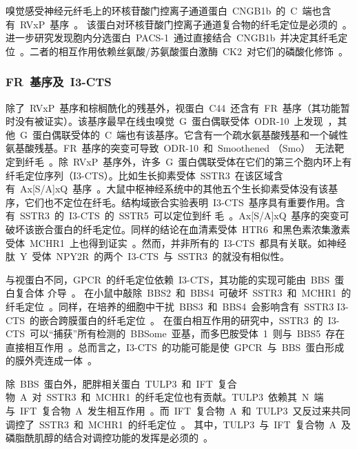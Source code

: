 嗅觉感受神经元纤毛上的环核苷酸门控离子通道蛋白\ CNGB1b\ 的\ C\ 端也含有\ RVxP\ 基序\ \citep{Jenkins2006}。 该蛋白对环核苷酸门控离子通道复合物的纤毛定位是必须的\ \citep{Jenkins2009,Michalakis2006}。 进一步研究发现胞内分选蛋白\ PACS-1\
通过直接结合\ CNGB1b\ 并决定其纤毛定位\ \citep{Jenkins2009}。二者的相互作用依赖丝氨酸/苏氨酸蛋白激酶\ CK2\ 对它们的磷酸化修饰\ \citep{Jenkins2009}。

\subsubsection{FR\ 基序及\ I3-CTS}
除了\ RVxP\ 基序和棕榈酰化的残基外，视蛋白\ C44\ 还含有\ FR\ 基序（其功能暂时没有被证实）。该基序最早在线虫嗅觉\ G\ 蛋白偶联受体\ ODR-10\ 上发现\ \citep{Dwyer2001}，其他\ G\ 蛋白偶联受体的\ C\ 端也有该基序。它含有一个疏水氨基酸残基和一个碱性氨基酸残基。FR\ 基序的突变可导致\ ODR-10\ 和\ Smoothened （Smo）\ 无法靶定到纤毛\ \citep{Dwyer2001}。除\ RVxP\ 基序外，许多\ G\ 蛋白偶联受体在它们的第三个胞内环上有纤毛定位序列（I3-CTS）\citep{Berbari2008}。比如生长抑素受体\ SSTR3\ 在该区域含有\ Ax[S/A]xQ\ 基序\ \citep{Berbari2008}。大鼠中枢神经系统中的其他五个生长抑素受体没有该基序，它们也不定位在纤毛。结构域嵌合实验表明\ I3-CTS\ 基序具有重要作用。含有\ SSTR3\ 的\ I3-CTS\ 的\ SSTR5\ 可以定位到纤
毛\ \citep{Berbari2008}。Ax[S/A]xQ\ 基序的突变可破坏该嵌合蛋白的纤毛定位。同样的结论在血清素受体\ HTR6\ 和黑色素浓集激素受体\ MCHR1\
上也得到证实\ \citep{Berbari2008}。然而，并非所有的\ I3-CTS\ 都具有关联。如神经肽\ Y\ 受体\ NPY2R\ 的两个\ I3-CTS\ 与\ SSTR3\ 的就没有相似性。

与视蛋白不同，GPCR\ 的纤毛定位依赖\ I3-CTS，其功能的实现可能由\ BBS\ 蛋白复合体
介导\ \citep{Berbari2008a}。 在小鼠中敲除\ BBS2\ 和\ BBS4\ 可破坏\ SSTR3\ 和\ MCHR1\ 的纤毛定位\ \citep{Berbari2008a}。同样，在培养的细胞中干扰\ BBS3\ 和\ BBS4\ 会影响含有\ SSTR3 I3-CTS\ 的嵌合跨膜蛋白的纤毛定位\ \citep{Berbari2008a}。 在蛋白相互作用的研究中，SSTR3\ 的\ I3-CTS\ 可以“捕获”所有检测的\ BBSome\ 亚基，而多巴胺受体\ 1\ 则与\ BBS5\ 存在直接相互作用\ \citep{Berbari2008a}。总而言之，I3-CTS\ 的功能可能是使\ GPCR\ 与\ BBS\ 蛋白形成的膜外壳连成一体\ \citep{Berbari2008a}。

除\ BBS\ 蛋白外，肥胖相关蛋白\ TULP3\ 和\ IFT\ 复合物\ A\ 对\ SSTR3\ 和\ MCHR1\ 的纤毛定位也有贡献。TULP3\ 依赖其\ N\ 端与\ IFT\ 复合物\ A\ 发生相互作用\ \citep{Mukhopadhyay2010}。而\ IFT\ 复合物\ A\ 和\ TULP3\ 又反过来共同调控了\ SSTR3\ 和\ MCHR1\ 的纤毛定位\ \citep{Mukhopadhyay2010}。 其中，TULP3\ 与\ IFT\ 复合物\ A\ 及磷脂酰肌醇的结合对调控功能的发挥是必须的\
\citep{Mukhopadhyay2010}。

